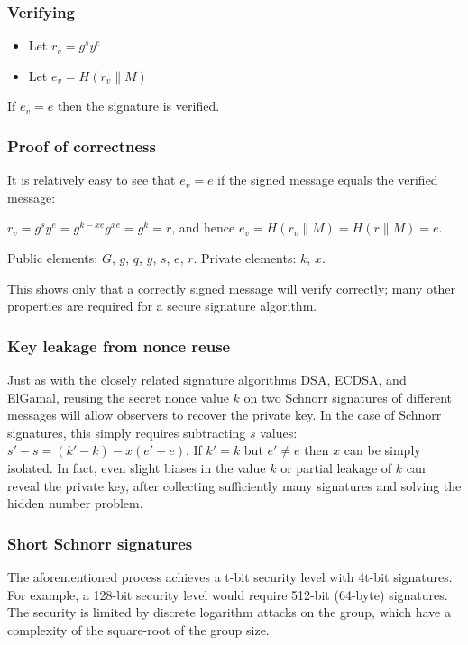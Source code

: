 \documentclass{article}
\begin{document}
\subsubsection{Verifying}
\begin{itemize}
    \item Let ${ r_{v}=g^{s}y^{e}}$
    \item Let ${ e_{v}=H(r_{v}\parallel M)}$

\end{itemize}
If ${ e_{v}=e}$ then the signature is verified.

\subsubsection{Proof of correctness}
It is relatively easy to see that ${ e_{v}=e}$ if the signed message equals the verified message:

${ r_{v}= g^{s}y^{e}= g^{k-xe}g^{xe}= g^{k}=r}$, and hence ${ e_{v}=H(r_{v}\parallel M)=H(r\parallel M)=e}$.

Public elements: ${ G}$, ${ g}$, ${ q}$, ${ y}$, ${ s}$, ${ e}$, ${ r}$. Private elements: ${ k}$, ${ x}$.

This shows only that a correctly signed message will verify correctly; many other properties are required for a secure signature algorithm.

\subsubsection{Key leakage from nonce reuse}
Just as with the closely related signature algorithms DSA, ECDSA, and ElGamal, reusing the secret nonce value ${ k}$ on two Schnorr signatures of different messages will allow observers to recover the private key. In the case of Schnorr signatures, this simply requires subtracting ${ s}$ values:
${ s'-s=(k'-k)-x(e'-e)}$.
If ${ k'=k}$ but ${ e'\neq e}$ then ${ x}$ can be simply isolated. In fact, even slight biases in the value ${ k}$ or partial leakage of ${ k}$ can reveal the private key, after collecting sufficiently many signatures and solving the hidden number problem.

\subsubsection{Short Schnorr signatures}
The aforementioned process achieves a t-bit security level with 4t-bit signatures. For example, a 128-bit security level would require 512-bit (64-byte) signatures. The security is limited by discrete logarithm attacks on the group, which have a complexity of the square-root of the group size.
\end{document}
